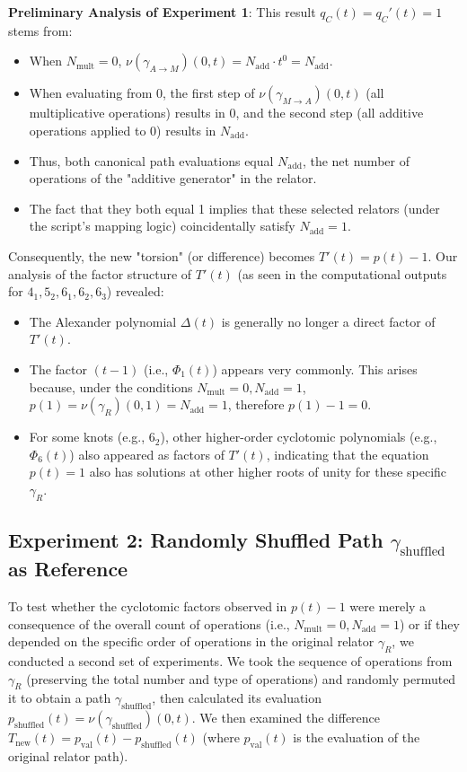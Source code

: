 \documentclass{article}[a4paper,12pt]
\begin{document}
\textbf{Preliminary Analysis of Experiment 1}:
This result $q_C(t)=q_C'(t)=1$ stems from:
\begin{itemize}
    \item When $N_{\text{mult}}=0$, $\nu(\gamma_{A \to M})(0,t) = N_{\text{add}} \cdot t^0 = N_{\text{add}}$.
    \item When evaluating from 0, the first step of $\nu(\gamma_{M \to A})(0,t)$ (all multiplicative operations) results in 0, and the second step (all additive operations applied to 0) results in $N_{\text{add}}$.
    \item Thus, both canonical path evaluations equal $N_{\text{add}}$, the net number of operations of the "additive generator" in the relator.
    \item The fact that they both equal 1 implies that these selected relators (under the script's mapping logic) coincidentally satisfy $N_{\text{add}}=1$.
\end{itemize}
Consequently, the new "torsion" (or difference) becomes $T'(t) = p(t) - 1$. Our analysis of the factor structure of $T'(t)$ (as seen in the computational outputs for $4_1, 5_2, 6_1, 6_2, 6_3$) revealed:
\begin{itemize}
    \item The Alexander polynomial $\Delta(t)$ is generally no longer a direct factor of $T'(t)$.
    \item The factor $(t-1)$ (i.e., $\Phi_1(t)$) appears very commonly. This arises because, under the conditions $N_{\text{mult}}=0, N_{\text{add}}=1$, $p(1) = \nu(\gamma_R)(0,1) = N_{\text{add}} = 1$, therefore $p(1)-1=0$.
    \item For some knots (e.g., $6_2$), other higher-order cyclotomic polynomials (e.g., $\Phi_6(t)$) also appeared as factors of $T'(t)$, indicating that the equation $p(t)=1$ also has solutions at other higher roots of unity for these specific $\gamma_R$.
\end{itemize}

\subsection*{Experiment 2: Randomly Shuffled Path $\gamma_{\text{shuffled}}$ as Reference}

To test whether the cyclotomic factors observed in $p(t)-1$ were merely a consequence of the overall count of operations (i.e., $N_{\text{mult}}=0, N_{\text{add}}=1$) or if they depended on the specific order of operations in the original relator $\gamma_R$, we conducted a second set of experiments.
We took the sequence of operations from $\gamma_R$ (preserving the total number and type of operations) and randomly permuted it to obtain a path $\gamma_{\text{shuffled}}$, then calculated its evaluation $p_{\text{shuffled}}(t) = \nu(\gamma_{\text{shuffled}})(0,t)$. We then examined the difference $T_{\text{new}}(t) = p_{\text{val}}(t) - p_{\text{shuffled}}(t)$ (where $p_{\text{val}}(t)$ is the evaluation of the original relator path).
\end{document}
